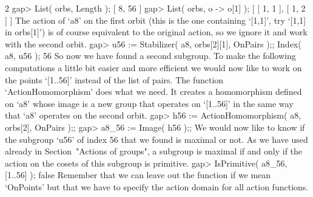 2
gap> List( orbs, Length );
[ 8, 56 ]
gap> List( orbs, o -> o[1] );
[ [ 1, 1 ], [ 1, 2 ] ]
\endexample
The action of `a8'   on the first  orbit (this  is the one  containing
`[1,1]', try `[1,1] in orbs[1]') is of  course equivalent to the original
action, so we ignore it and work with the second orbit.
\beginexample
gap> u56 := Stabilizer( a8, orbs[2][1], OnPairs );; Index( a8, u56 );
56
\endexample
So   now   we have  found   a  second subgroup.   To   make the following
computations a little bit easier and more efficient  we would now like to
work on the points `[1..56]'  instead of the list  of pairs. The function
`ActionHomomorphism' does what  we need.   It creates a   homomorphism
defined on `a8' whose image is a new group  that operates on `[1..56]' in
the same way that `a8' operates on the second orbit.
\beginexample
gap> h56 := ActionHomomorphism( a8, orbs[2], OnPairs );;
gap> a8_56 := Image( h56 );;
\endexample
We would now like to know if the subgroup `u56' of index 56 that we found
is  maximal or  not.
As we have used already in Section~"Actions of groups",
a subgroup is maximal if and only if the action on the cosets of this
subgroup is primitive.
\beginexample
gap> IsPrimitive( a8_56, [1..56] );
false
\endexample
Remember that we  can leave out the  function  if we mean  `OnPoints' but
that we have to specify the action domain for all action functions.

%


